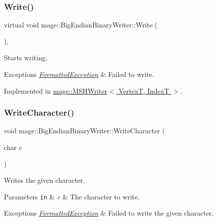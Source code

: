 \subsubsection{\texorpdfstring{Write()}{Write()}}
{\footnotesize\ttfamily virtual void mage\+::\+Big\+Endian\+Binary\+Writer\+::\+Write (\begin{DoxyParamCaption}{ }\end{DoxyParamCaption})\hspace{0.3cm}{\ttfamily [private]}, {}}

Starts writing.


\begin{DoxyExceptions}{Exceptions}
{\em \hyperlink{classmage_1_1_formatted_exception}{Formatted\+Exception}} & Failed to write. \\
\hline
\end{DoxyExceptions}


Implemented in \hyperlink{classmage_1_1_m_s_h_writer_ab97c9570c45bff97d88700d0dcf3ed75}{mage\+::\+M\+S\+H\+Writer$<$ Vertex\+T, Index\+T $>$}.

\hypertarget{classmage_1_1_big_endian_binary_writer_a869eff3f6e0666406bd5470af3e02096}{}\label{classmage_1_1_big_endian_binary_writer_a869eff3f6e0666406bd5470af3e02096} 
\subsubsection{\texorpdfstring{Write\+Character()}{WriteCharacter()}}
{\footnotesize\ttfamily void mage\+::\+Big\+Endian\+Binary\+Writer\+::\+Write\+Character (\begin{DoxyParamCaption}\item[{char}]{c }\end{DoxyParamCaption})\hspace{0.3cm}{\ttfamily [protected]}}

Writes the given character.


\begin{DoxyParams}[1]{Parameters}
\mbox{\tt in}  & {\em c} & The character to write. \\
\hline
\end{DoxyParams}

\begin{DoxyExceptions}{Exceptions}
{\em \hyperlink{classmage_1_1_formatted_exception}{Formatted\+Exception}} & Failed to write the given character. \\
\hline
\end{DoxyExceptions}
\hypertarget{classmage_1_1_big_endian_binary_writer_a1a62be10de26eb77e1812e6807eb4c02}{}\label{classmage_1_1_big_endian_binary_writer_a1a62be10de26eb77e1812e6807eb4c02} 
